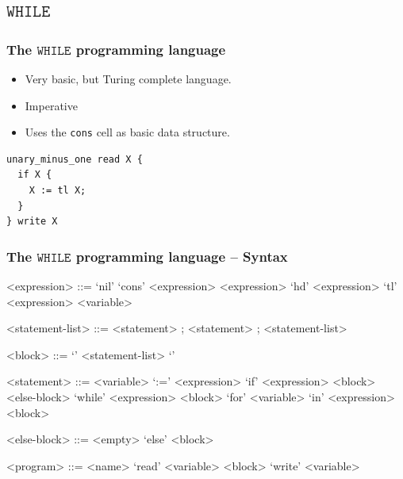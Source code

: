 \documentclass{beamer}
\newcommand*{\WHILE}{\ensuremath{\mathtt{WHILE}}\xspace}
\theoremstyle{definition}
\begin{document}
\subsection{\WHILE}
\begin{frame}[fragile]
	\frametitle{The \WHILE programming language}
	\begin{itemize}
		\item Very basic, but Turing complete language.
		\item Imperative
		\item Uses the {\tt cons} cell as basic data structure.
	\end{itemize}
	\begin{example}
		\begin{verbatim}
unary_minus_one read X {
  if X {
    X := tl X;
  }
} write X\end{verbatim}
	\end{example}
\end{frame}

\begin{frame}[fragile]
	\frametitle{The \WHILE programming language -- Syntax}
	\begin{center}
		\begin{tiny}
			\begin{grammar}
				<expression> ::= 
									`nil' 
						\alt 	`cons' <expression> <expression>
						\alt 	`hd' <expression>
						\alt 	`tl' <expression>
						\alt 	<variable>

				<statement-list> ::= <statement> ;  ; <statement-list>

				<block> ::= `{' <statement-list> `}'

				<statement> ::=
									<variable> `:=' <expression>
						\alt	`if' <expression> <block> <else-block>
						\alt	`while' <expression> <block>
						\alt	`for' <variable> `in' <expression> <block>
					
						<else-block> ::= <empty> \alt `else' <block>
						
						<program> ::= <name> `read' <variable> <block> `write' <variable>
			\end{grammar}
		\end{tiny}
	\end{center}
\end{frame}
\end{document}
